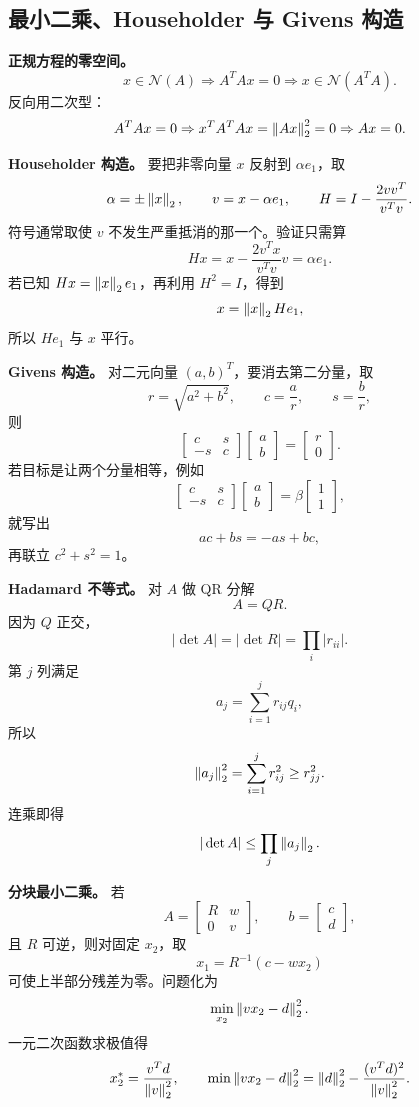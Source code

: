\documentclass{article}
\begin{document}
\subsection{最小二乘、Householder 与 Givens 构造}

\textbf{正规方程的零空间。}
\[
  x\in\mathcal N(A)\Rightarrow A^TAx=0
  \Rightarrow x\in\mathcal N(A^TA).
\]
反向用二次型：
\[
  A^TAx=0
  \Rightarrow x^TA^TAx=\left\| Ax \right\|_2^2=0
  \Rightarrow Ax=0.
\]

\textbf{Householder 构造。} 要把非零向量 $x$ 反射到 $\alpha e_1$，取
\[
  \alpha=\pm\left\| x \right\|_2,\qquad
  v=x-\alpha e_1,\qquad
  H=I-\frac{2vv^T}{v^Tv}.
\]
符号通常取使 $v$ 不发生严重抵消的那一个。验证只需算
\[
  Hx=x-\frac{2v^Tx}{v^Tv}v=\alpha e_1.
\]
若已知 $Hx=\left\| x \right\|_2e_1$，再利用 $H^2=I$，得到
\[
  x=\left\| x \right\|_2He_1,
\]
所以 $He_1$ 与 $x$ 平行。

\textbf{Givens 构造。} 对二元向量 $(a,b)^T$，要消去第二分量，取
\[
  r=\sqrt{a^2+b^2},\qquad c=\frac{a}{r},\qquad s=\frac{b}{r},
\]
则
\[
  \begin{bmatrix}c&s\\-s&c\end{bmatrix}
  \begin{bmatrix}a\\b\end{bmatrix}
  =
  \begin{bmatrix}r\\0\end{bmatrix}.
\]
若目标是让两个分量相等，例如
\[
  \begin{bmatrix}c&s\\-s&c\end{bmatrix}
  \begin{bmatrix}a\\b\end{bmatrix}
  =
  \beta\begin{bmatrix}1\\1\end{bmatrix},
\]
就写出
\[
  ac+bs=-as+bc,
\]
再联立 $c^2+s^2=1$。

\textbf{Hadamard 不等式。} 对 $A$ 做 QR 分解
\[
  A=QR.
\]
因为 $Q$ 正交，
\[
  |\det A|=|\det R|=\prod_i |r_{ii}|.
\]
第 $j$ 列满足
\[
  a_j=\sum_{i=1}^j r_{ij}q_i,
\]
所以
\[
  \left\| a_j \right\|_2^2=\sum_{i=1}^j r_{ij}^2\ge r_{jj}^2.
\]
连乘即得
\[
  |\det A|\le\prod_j\left\| a_j \right\|_2.
\]

\textbf{分块最小二乘。} 若
\[
  A=\begin{bmatrix}R&w\\0&v\end{bmatrix},\qquad
  b=\begin{bmatrix}c\\d\end{bmatrix},
\]
且 $R$ 可逆，则对固定 $x_2$，取
\[
  x_1=R^{-1}(c-wx_2)
\]
可使上半部分残差为零。问题化为
\[
  \min_{x_2}\left\| vx_2-d \right\|_2^2.
\]
一元二次函数求极值得
\[
  x_2^*=\frac{v^Td}{\left\| v \right\|_2^2},\qquad
  \min\left\| vx_2-d \right\|_2^2
  =\left\| d \right\|_2^2-\frac{(v^Td)^2}{\left\| v \right\|_2^2}.
\]
\end{document}

